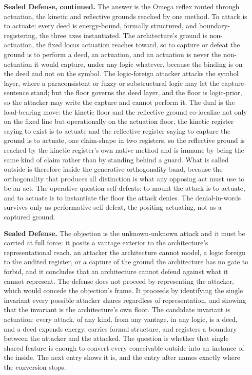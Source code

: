 \documentclass[10pt,twocolumn]{article}
\begin{document}
\textbf{Sealed Defense, continued.} The answer is the Omega reflex
routed through actuation, the kinetic and reflective grounds reached by
one method. To attack is to actuate: every deed is energy-bound,
formally structured, and boundary-registering, the three axes
instantiated. The architecture's ground is non-actuation, the fixed
locus actuation reaches toward, so to capture or defeat the ground is to
perform a deed, an actuation, and an actuation is never the
non-actuation it would capture, under any logic whatever, because the
binding is on the deed and not on the symbol. The logic-foreign attacker
attacks the symbol layer, where a paraconsistent or fuzzy or
substructural logic may let the capture-sentence stand; but the floor
governs the deed layer, and the floor is logic-prior, so the attacker
may write the capture and cannot perform it. The dual is the
load-bearing move: the kinetic floor and the reflective ground
co-localize not only on the fixed line but operationally on the
actuation floor, the kinetic register saying to exist is to actuate and
the reflective register saying to capture the ground is to actuate, one
claim-shape in two registers, so the reflective ground is reached by the
kinetic register's own native method and is immune by being the same
kind of claim rather than by standing behind a guard. What is called
outside is therefore inside the generative orthogonality band, because
the orthogonality that produces all distinction is what any opposing act
must use to be an act. The operative question self-defeats: to mount the
attack is to actuate, and to actuate is to instantiate the floor the
attack denies. The denial-in-words survives only as performative
self-defeat, the positing actuating, not as a captured ground.

\textbf{Sealed Defense.} The objection is the unknown-unknown attack and
it must be carried at full force: it posits a vantage exterior to the
architecture's representational reach, an attacker the architecture
cannot model, a logic foreign to the audited register, or a capture of
the ground the architecture has no gate to forbid, and it concludes that
an architecture cannot defend against what it cannot represent. The
defense does not proceed by representing the attacker, which would
concede the objection's frame. It proceeds by identifying the single
invariant every possible attacker shares regardless of representation,
and showing that the invariant is the architecture's own floor. The
candidate invariant is actuation: every attack, of any kind, from any
vantage, in any logic, is a deed, and a deed expends energy, carries
formal structure, and registers a boundary between the attacker and the
attacked. The question is whether that single shared feature is enough
to convert every conceivable outside into an instance of the inside. The
next entry shows it is, and the entry after names exactly where the
conversion stops.
\end{document}

